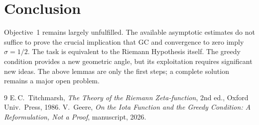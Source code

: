 \documentclass[11pt,a4paper]{article}
\begin{document}
\section{Conclusion}
Objective~1 remains largely unfulfilled.  The available asymptotic estimates do not suffice to prove the crucial implication that GC and convergence to zero imply $\sigma=1/2$.  The task is equivalent to the Riemann Hypothesis itself.  The greedy condition provides a new geometric angle, but its exploitation requires significant new ideas.  The above lemmas are only the first steps; a complete solution remains a major open problem.

\begin{thebibliography}{9}
 E.\,C.\ Titchmarsh, \textit{The Theory of the Riemann Zeta‑function}, 2nd ed., Oxford Univ.\ Press, 1986.
 V.\ Geere, \textit{On the Iota Function and the Greedy Condition: A Reformulation, Not a Proof}, manuscript, 2026.
\end{thebibliography}
\end{document}
